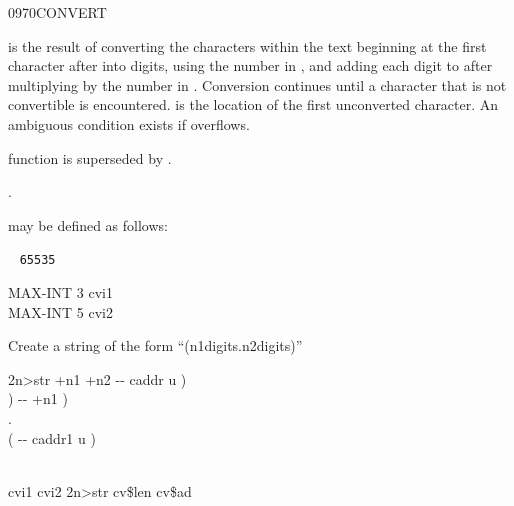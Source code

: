 \begin{worddef}{0970}{CONVERT}
\item {}

	 is the result of converting the characters within
	the text beginning at the first character after 
	into digits, using the number in , and adding each
	digit to  after multiplying  by the
	number in . Conversion continues until a character
	that is not convertible is encountered.  is
	the location of the first unconverted character. An ambiguous
	condition exists if  overflows.

\note {}
	 function is superseded by
	.

\see {}.

	\begin{rationale} %
		 may be defined as follows:

		\tab \word{:} ~
			 \texttt{65535}  
		\word{;}
	\end{rationale}

	\begin{testing}\ttfamily
	\cbstart{}

		MAX-INT  3 \word{/}  cvi1 \\
		MAX-INT  5 \word{/}  cvi2

		\textsf{Create a string of the form ``(n1digits.n2digits)''}

		\word{:} 2n>str   +n1 +n2 -{}- caddr u ) \\
		\tab {} \word{[CHAR]} )    	\tab {} -{}- +n1 ) \\
		\tab[2.3] \word{[CHAR]} .    \\
		\tab[2.3] \word{[CHAR]} (  				\tab[6]  -{}- caddr1 u ) \\
		\tab {}         \\
		\word{;}

		cvi1 cvi2 2n>str  cv\$len  cv\$ad

		 \\
	\cbend
	\end{testing}
\end{worddef}


